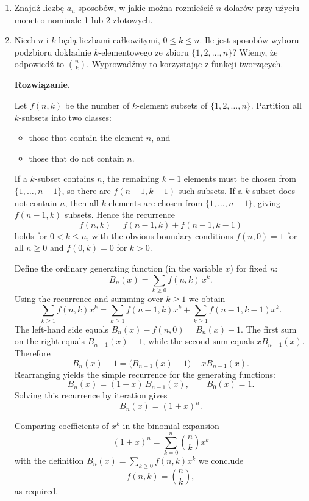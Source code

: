 \documentclass{lecture-kuznia}
\newenvironment{solutionbox}{%
    \begin{mdframed}[style=solstyle]\noindent\textbf{Rozwiązanie.}\par\smallskip
  }{%
    \end{mdframed}
  }
\begin{document}
\begin{enumerate}[label=\textbf{Zad. \arabic*}]

\item Znajdź liczbę $a_n$ sposobów, w jakie można rozmieścić $n$ dolarów przy użyciu monet o nominale 1 lub 2 złotowych. 

\item Niech \(n\) i \(k\) będą liczbami całkowitymi, \(0\le k\le n\). Ile jest sposobów wyboru podzbioru dokładnie \(k\)-elementowego ze zbioru \(\{1,2,\dots,n\}\)? Wiemy, że odpowiedź to \(\binom{n}{k}\). Wyprowadźmy to korzystając z funkcji tworzących.

\begin{solutionbox}
Let \(f(n,k)\) be the number of \(k\)-element subsets of \(\{1,2,\dots,n\}\).
Partition all \(k\)-subsets into two classes:
\begin{itemize}
  \item those that contain the element \(n\), and
  \item those that do not contain \(n\).
\end{itemize}
If a \(k\)-subset contains \(n\), the remaining \(k-1\) elements must be chosen from \(\{1,\dots,n-1\}\), so there are \(f(n-1,k-1)\) such subsets. If a \(k\)-subset does not contain \(n\), then all \(k\) elements are chosen from \(\{1,\dots,n-1\}\), giving \(f(n-1,k)\) subsets. Hence the recurrence
\[
f(n,k)=f(n-1,k)+f(n-1,k-1)
\]
holds for \(0<k\le n\), with the obvious boundary conditions \(f(n,0)=1\) for all \(n\ge0\) and \(f(0,k)=0\) for \(k>0\).

Define the ordinary generating function (in the variable \(x\)) for fixed \(n\):
\[
B_n(x)=\sum_{k\ge0} f(n,k)\,x^k.
\]
Using the recurrence and summing over \(k\ge1\) we obtain
\[
\sum_{k\ge1} f(n,k)x^k
= \sum_{k\ge1} f(n-1,k)x^k + \sum_{k\ge1} f(n-1,k-1)x^k.
\]
The left-hand side equals \(B_n(x)-f(n,0)=B_n(x)-1\). The first sum on the right equals \(B_{n-1}(x)-1\), while the second sum equals \(xB_{n-1}(x)\). Therefore
\[
B_n(x)-1 = \bigl(B_{n-1}(x)-1\bigr) + xB_{n-1}(x).
\]
Rearranging yields the simple recurrence for the generating functions:
\[
B_n(x) = (1+x)\,B_{n-1}(x),\qquad B_0(x)=1.
\]
Solving this recurrence by iteration gives
\[
B_n(x)=(1+x)^n.
\]

Comparing coefficients of \(x^k\) in the binomial expansion
\[
(1+x)^n=\sum_{k=0}^n \binom{n}{k} x^k
\]
with the definition \(B_n(x)=\sum_{k\ge0} f(n,k)x^k\) we conclude
\[
f(n,k)=\binom{n}{k},
\]
as required.
\end{solutionbox}


\end{enumerate}
\end{document}
